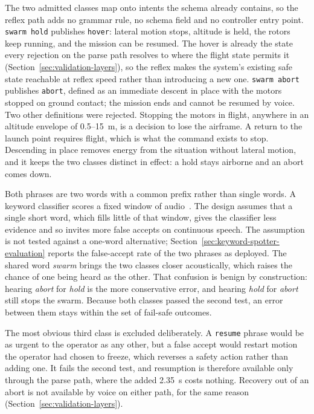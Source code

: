 The two admitted classes map onto intents the schema already contains, so the reflex path adds no
grammar rule, no schema field and no controller entry point. \texttt{swarm hold} publishes
\texttt{hover}: lateral motion stops, altitude is held, the rotors keep running, and the mission can
be resumed. The hover is already the state every rejection on the parse path resolves to where the
flight state permits it (Section~\ref{sec:validation-layers}), so the reflex makes the system's
existing safe state reachable at reflex speed rather than introducing a new one. \texttt{swarm
abort} publishes \texttt{abort}, defined as an immediate descent in place with the motors stopped on
ground contact; the mission ends and cannot be resumed by voice. Two other definitions were
rejected. Stopping the motors in flight, anywhere in an altitude envelope of 0.5--15~m, is a
decision to lose the airframe. A return to the launch point requires flight, which is what the
command exists to stop. Descending in place removes energy from the situation without lateral
motion, and it keeps the two classes distinct in effect: a hold stays airborne and an abort comes
down.

Both phrases are two words with a common prefix rather than single words. A keyword classifier
scores a fixed window of audio~\cite{oww}. The design assumes that a single short word, which
fills little of that window, gives the classifier less evidence and so invites more false accepts
on continuous speech. The assumption is not tested against a one-word alternative;
Section~\ref{sec:keyword-spotter-evaluation} reports the false-accept rate of the two phrases as
deployed. The shared word \emph{swarm} brings the two classes closer acoustically, which raises
the chance of one being heard as the other. That confusion is benign by construction: hearing \emph{abort}
for \emph{hold} is the more conservative error, and hearing \emph{hold} for \emph{abort} still
stops the swarm. Because both classes passed the second test, an error between them stays within
the set of fail-safe outcomes.

The most obvious third class is excluded deliberately. A \texttt{resume} phrase would be as
urgent to the operator as any other, but a false accept would restart motion the operator had
chosen to freeze, which reverses a safety action rather than adding one. It fails the second test,
and resumption is therefore available only through the parse path, where the added 2.35~s costs
nothing. Recovery out of an abort is not available by voice on either path, for the same reason
(Section~\ref{sec:validation-layers}).

